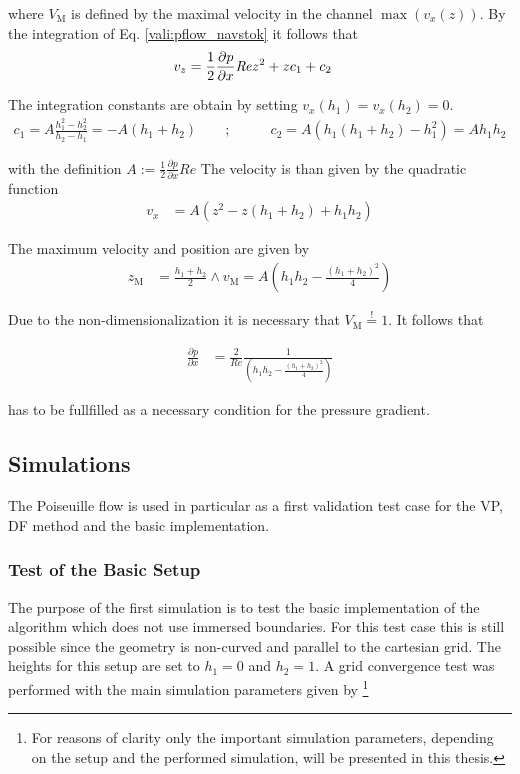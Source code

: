 where $V_\text{M}$ is defined by the maximal velocity in the channel $\max(v_x(z))$.
By the integration of Eq. \ref{vali:pflow_navstok} it follows that
\begin{align}
v_z &= \frac{1}{2}\frac{\partial p}{\partial x}\mbox{\textit{Re}} z^2 + zc_1 + c_2
\end{align}

The integration constants are obtain by setting $v_x(h_1) = v_x(h_2) = 0$.
\begin{align}
c_1 = A\frac{h_1^2 -h_2^2}{h_2 - h_1} = -A(h_1+h_2)\qquad ;& \qquad
c_2 = A(h_1(h_1 + h_2) - h_1^2) = Ah_1h_2
\end{align}

with the definition $A:=\frac{1}{2}\frac{\partial p}{\partial x} Re$
The velocity is than given by the quadratic function
\begin{align}
\label{vali:pflow_theosol}
v_x &= A(z^2 - z(h_1 + h_2) + h_1h_2)
\end{align}

The maximum velocity and position are given by
\begin{align}
z_{\text{M}} &= \frac{h_1+h_2}{2} \wedge v_{\text{M}} = A\left(h_1h_2 - \frac{(h_1 + h_2)^2}{4}\right)
\end{align}

Due to the non-dimensionalization it is necessary that $V_{\text{M}} \overset{!}{=}  1$.
It follows that

\begin{align}
    \label{vali:pflow_pcondi}
\frac{\partial p}{\partial x} &= \frac{2}{Re}\frac{1}{\left(h_1h_2 - \frac{(h_1+h_2)^2}{4} \right)}
\end{align}

has to be fullfilled as a necessary condition for the pressure gradient.

\subsection{Simulations}

The Poiseuille flow is used in particular as a first validation test case
for the VP, DF method  and the basic implementation.

\subsubsection{Test of the Basic Setup}

The purpose of the first simulation is to test  the basic
implementation of the algorithm which does not use immersed boundaries.
For this test case this is still possible since the geometry is non-curved
and parallel to the cartesian grid. The heights for this setup are set to $h_1=0$ and $h_2=1$.
A grid convergence test was performed with the main simulation parameters given by
\footnote{For reasons of clarity only the important simulation parameters, depending on the setup and the performed simulation,  will be presented in this thesis.}

